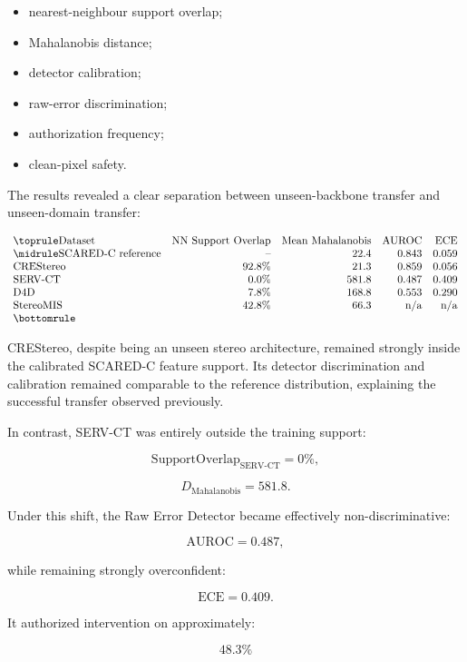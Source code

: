 \documentclass[11pt,a4paper]{article}
\begin{document}
\begin{itemize}
    \item nearest-neighbour support overlap;
    \item Mahalanobis distance;
    \item detector calibration;
    \item raw-error discrimination;
    \item authorization frequency;
    \item clean-pixel safety.
\end{itemize}

The results revealed a clear separation between unseen-backbone transfer and unseen-domain transfer:

\[
\begin{array}{lrrrr}
\toprule
\text{Dataset}
&
\text{NN Support Overlap}
&
\text{Mean Mahalanobis}
&
\text{AUROC}
&
\text{ECE}
\\
\midrule
\text{SCARED-C reference}
& \text{--} & 22.4 & 0.843 & 0.059
\\
\text{CREStereo}
& 92.8\% & 21.3 & 0.859 & 0.056
\\
\text{SERV-CT}
& 0.0\% & 581.8 & 0.487 & 0.409
\\
\text{D4D}
& 7.8\% & 168.8 & 0.553 & 0.290
\\
\text{StereoMIS}
& 42.8\% & 66.3 & \text{n/a} & \text{n/a}
\\
\bottomrule
\end{array}
\]

CREStereo, despite being an unseen stereo architecture, remained strongly inside the calibrated SCARED-C feature support. Its detector discrimination and calibration remained comparable to the reference distribution, explaining the successful transfer observed previously.

In contrast, SERV-CT was entirely outside the training support:

\[
\mathrm{SupportOverlap}_{\mathrm{SERV\text{-}CT}}=0\%,
\]

\[
D_{\mathrm{Mahalanobis}}=581.8.
\]

Under this shift, the Raw Error Detector became effectively non-discriminative:

\[
\mathrm{AUROC}=0.487,
\]

while remaining strongly overconfident:

\[
\mathrm{ECE}=0.409.
\]

It authorized intervention on approximately:

\[
48.3\%
\]
\end{document}
